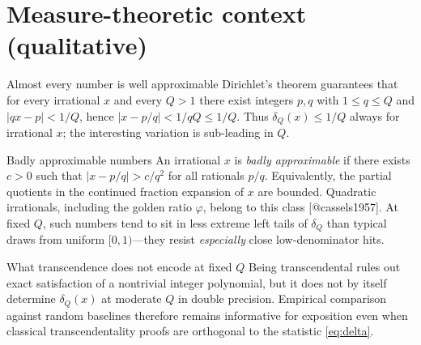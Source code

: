 \documentclass[
  ignorenonframetext,
]{beamer}
\author{\texorpdfstring{}{}}
\date{}
\begin{document}
\section{Measure-theoretic context
(qualitative)}\label{measure-theoretic-context-qualitative}

\begin{frame}{Almost every number is well approximable}
\protect{}\label{almost-every-number-is-well-approximable}
Dirichlet's theorem guarantees that for every irrational \(x\) and every
\(Q>1\) there exist integers \(p,q\) with \(1 \leq q \leq Q\) and
\(|qx - p| < 1/Q\), hence \(|x - p/q| < 1/qQ \leq 1/Q\). Thus
\(\delta_Q(x) \leq 1/Q\) always for irrational \(x\); the interesting
variation is sub-leading in \(Q\).
\end{frame}

\begin{frame}{Badly approximable numbers}
\protect{}\label{badly-approximable-numbers}
An irrational \(x\) is \emph{badly approximable} if there exists \(c>0\)
such that \(|x - p/q| > c/q^2\) for all rationals \(p/q\). Equivalently,
the partial quotients in the continued fraction expansion of \(x\) are
bounded. Quadratic irrationals, including the golden ratio \(\varphi\),
belong to this class {[}@cassels1957{]}. At fixed \(Q\), such numbers
tend to sit in less extreme left tails of \(\delta_Q\) than typical
draws from uniform \([0,1)\)---they resist \emph{especially} close
low-denominator hits.
\end{frame}

\begin{frame}{What transcendence does not encode at fixed \(Q\)}
\protect{}\label{what-transcendence-does-not-encode-at-fixed-q}
Being transcendental rules out exact satisfaction of a nontrivial
integer polynomial, but it does not by itself determine \(\delta_Q(x)\)
at moderate \(Q\) in double precision. Empirical comparison against
random baselines therefore remains informative for exposition even when
classical transcendentality proofs are orthogonal to the statistic
\eqref{eq:delta}.
\end{frame}
\end{document}
